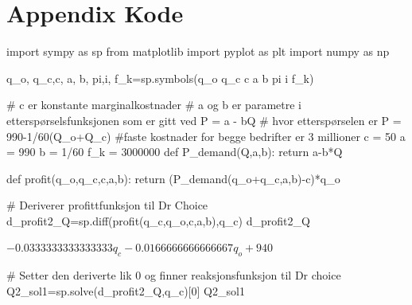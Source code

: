 \documentclass[
  12pt,
  a4paper,
  DIV=11,
  numbers=noendperiod]{scrartcl}
\newenvironment{Shaded}{\begin{snugshade}}{\end{snugshade}}
\newcommand{\CommentTok}[1]{\textcolor[rgb]{0.37,0.37,0.37}{#1}}
\newcommand{\ControlFlowTok}[1]{\textcolor[rgb]{0.00,0.23,0.31}{#1}}
\newcommand{\DecValTok}[1]{\textcolor[rgb]{0.68,0.00,0.00}{#1}}
\newcommand{\ImportTok}[1]{\textcolor[rgb]{0.00,0.46,0.62}{#1}}
\newcommand{\KeywordTok}[1]{\textcolor[rgb]{0.00,0.23,0.31}{#1}}
\newcommand{\NormalTok}[1]{\textcolor[rgb]{0.00,0.23,0.31}{#1}}
\newcommand{\OperatorTok}[1]{\textcolor[rgb]{0.37,0.37,0.37}{#1}}
\newcommand{\StringTok}[1]{\textcolor[rgb]{0.13,0.47,0.30}{#1}}
\begin{document}
\clearpage

\section {Appendix Kode}

\begin{Shaded}
\begin{Highlighting}[]
\ImportTok{import}\NormalTok{ sympy }\ImportTok{as}\NormalTok{ sp}
\ImportTok{from}\NormalTok{ matplotlib }\ImportTok{import}\NormalTok{ pyplot }\ImportTok{as}\NormalTok{ plt}
\ImportTok{import}\NormalTok{ numpy }\ImportTok{as}\NormalTok{ np}

\NormalTok{q\_o, q\_c,c, a, b, pi,i, f\_k}\OperatorTok{=}\NormalTok{sp.symbols(}\StringTok{\textquotesingle{}q\_o q\_c c a b pi i f\_k\textquotesingle{}}\NormalTok{)}


\CommentTok{\# c er konstante marginalkostnader}
\CommentTok{\# a og b er parametre i etterspørselsfunksjonen som er gitt ved P = a {-} bQ}
\CommentTok{\# hvor etterspørselen er P = 990{-}1/60(Q\_o+Q\_c)}
\CommentTok{\#faste kostnader for begge bedrifter er 3 millioner}
\NormalTok{c }\OperatorTok{=} \DecValTok{50}
\NormalTok{a }\OperatorTok{=} \DecValTok{990}
\NormalTok{b }\OperatorTok{=} \DecValTok{1}\OperatorTok{/}\DecValTok{60}
\NormalTok{f\_k }\OperatorTok{=} \DecValTok{3000000}
\KeywordTok{def}\NormalTok{ P\_demand(Q,a,b):}
    \ControlFlowTok{return}\NormalTok{ a}\OperatorTok{{-}}\NormalTok{b}\OperatorTok{*}\NormalTok{Q}

\KeywordTok{def}\NormalTok{ profit(q\_o,q\_c,c,a,b):}
    \ControlFlowTok{return}\NormalTok{ (P\_demand(q\_o}\OperatorTok{+}\NormalTok{q\_c,a,b)}\OperatorTok{{-}}\NormalTok{c)}\OperatorTok{*}\NormalTok{q\_o}
\end{Highlighting}
\end{Shaded}

\begin{Shaded}
\begin{Highlighting}[]
\CommentTok{\# Deriverer profittfunksjon til Dr Choice}
\NormalTok{d\_profit2\_Q}\OperatorTok{=}\NormalTok{sp.diff(profit(q\_c,q\_o,c,a,b),q\_c)}
\NormalTok{d\_profit2\_Q}
\end{Highlighting}
\end{Shaded}

$\displaystyle - 0.0333333333333333 q_{c} - 0.0166666666666667 q_{o} + 940$

\begin{Shaded}
\begin{Highlighting}[]
\CommentTok{\# Setter den deriverte lik 0 og finner reaksjonsfunksjon til Dr choice}
\NormalTok{Q2\_sol1}\OperatorTok{=}\NormalTok{sp.solve(d\_profit2\_Q,q\_c)[}\DecValTok{0}\NormalTok{]}
\NormalTok{Q2\_sol1}
\end{Highlighting}
\end{Shaded}
\end{document}
